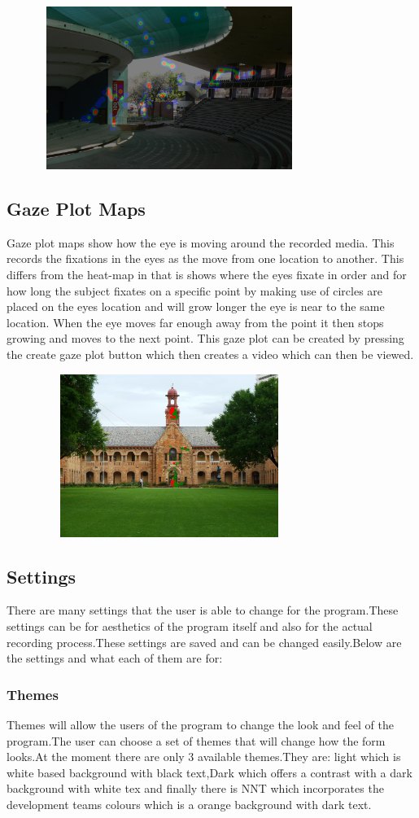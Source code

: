 \includegraphics[width=400px,height=200px]{./Images/hm.JPG}
\subsection{Gaze Plot Maps}
Gaze plot maps show how the eye is moving around the recorded media. This records the fixations in the eyes as the move from one location to another. This differs from the heat-map in that is shows where the eyes fixate in order and for how long the subject fixates on a specific point by making use of circles are placed on the eyes location and will grow longer the eye is near to the same location. When the eye moves far enough away from the point it then stops growing and moves to the next point. This gaze plot can be created by pressing the create gaze plot button which then creates a video which can then be viewed.

\includegraphics[width=400px,height=200px]{./Images/ET.JPG}
 
\iffalse
\subsection{Settings}
There are many settings that the user is able to change for the program.These settings can be for aesthetics of the program itself and also for the actual recording process.These settings are saved and can be changed easily.Below are the settings and what each of them are for:
\subsubsection{Themes}
Themes will allow the users of the program to change the look and feel of the program.The user can choose a set of themes that will change how the form looks.At the moment there are only 3 available themes.They are: light which is white based background with black  text,Dark which offers a contrast with a dark background with white tex and finally there is NNT which incorporates the development teams colours which is a orange background with dark text. 
